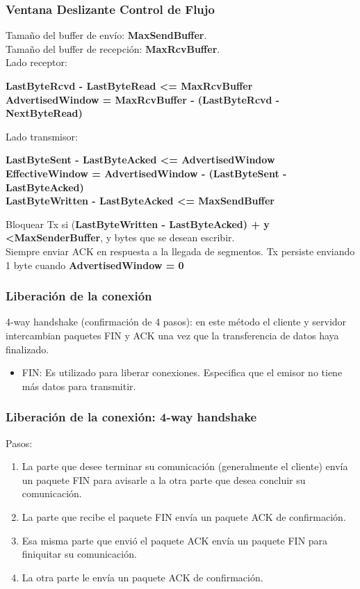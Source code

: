 \documentclass{beamer}
\begin{document}
 \begin{frame}
 		\frametitle{Ventana Deslizante Control de Flujo}
 		Tamaño del buffer de envío: \textbf{MaxSendBuffer}.\\
 		Tamaño del buffer de recepción: \textbf{MaxRcvBuffer}.\\
 		Lado receptor:
 		\begin{center}
 			\textbf{
 			LastByteRcvd - LastByteRead \textless= MaxRcvBuffer\\
 			 AdvertisedWindow = MaxRcvBuffer - (LastByteRcvd - NextByteRead)
 		}
 		\end{center}
 	Lado transmisor:
 	\begin{center}
 		\textbf{
 		LastByteSent - LastByteAcked  \textless= AdvertisedWindow\\
 		 EffectiveWindow = AdvertisedWindow - (LastByteSent - LastByteAcked)\\
 	 LastByteWritten - LastByteAcked \textless= MaxSendBuffer\\
 }\end{center}
 Bloquear Tx si (\textbf{LastByteWritten - LastByteAcked) + y \textless MaxSenderBuffer}, y
 bytes que se desean escribir.\\
 Siempre enviar ACK en respuesta a la llegada de segmentos. 
 Tx persiste enviando 1 byte cuando \textbf{AdvertisedWindow = 0} \\

\end{frame}

\begin{frame}
\frametitle{Liberación de la conexión}
4-way handshake (confirmación de 4 pasos): en este método el cliente y servidor intercambian paquetes FIN y ACK una vez que la transferencia de datos haya finalizado.
\vspace{5mm}
\begin{itemize}
\item FIN: Es utilizado para liberar conexiones. Especifica que el emisor no tiene más datos para transmitir. 
\end{itemize}
\end{frame}

\begin{frame}
\frametitle{Liberación de la conexión: 4-way handshake}
Pasos:
\vspace{5mm}
\begin{enumerate}
\item La parte que desee terminar su comunicación (generalmente el cliente) envía un paquete FIN para avisarle a la otra parte que desea concluir su comunicación.
\item La parte que recibe el paquete FIN envía un paquete ACK de confirmación.
\item Esa misma parte que envió el paquete ACK envía un paquete FIN para finiquitar su comunicación.
\item La otra parte le envía un paquete ACK de confirmación.
\end{enumerate}
\end{frame}
\end{document}
